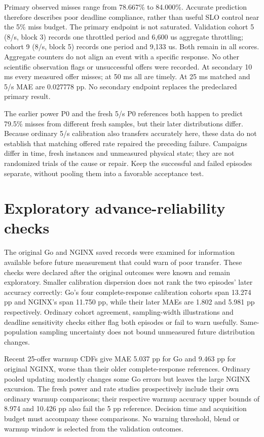 \documentclass[11pt,a4paper]{article}
\begin{document}
Primary observed misses range from 78.667\% to 84.000\%. Accurate prediction
therefore describes poor deadline compliance, rather than useful SLO control
near the 5\% miss budget. The primary endpoint is not saturated. Validation
cohort 5 (8/s, block 3) records one throttled period and 6,600 us aggregate
throttling; cohort 9 (8/s, block 5) records one period and 9,133 us. Both remain
in all scores. Aggregate counters do not align an event with a specific response.
No other scientific observation flags or unsuccessful offers were recorded.
At secondary 10 ms every measured offer misses; at 50 ms all are timely. At
25 ms matched and 5/s MAE are 0.027778 pp. No secondary endpoint replaces
the predeclared primary result.

The earlier power P0 and the fresh 5/s P0 references both happen to predict
79.5\% misses from different fresh samples, but their later distributions differ.
Because ordinary 5/s calibration also transfers accurately here, these data do
not establish that matching offered rate repaired the preceding failure.
Campaigns differ in time, fresh instances and unmeasured physical state; they
are not randomized trials of the cause or repair. Keep the successful and
failed episodes separate, without pooling them into a favorable acceptance test.

\section{Exploratory advance-reliability checks}

The original Go and NGINX saved records were examined for information available
before future measurement that could warn of poor transfer. These checks were
declared after the original outcomes were known and remain exploratory. Smaller
calibration dispersion does not rank the two episodes' later accuracy correctly:
Go's four complete-response calibration cohorts span 13.274 pp and NGINX's
span 11.750 pp, while their later MAEs are 1.802 and 5.981 pp respectively.
Ordinary cohort agreement, sampling-width illustrations and deadline sensitivity
checks either flag both episodes or fail to warn usefully. Same-population
sampling uncertainty does not bound unmeasured future distribution changes.

Recent 25-offer warmup CDFs give MAE 5.037 pp for Go and 9.463 pp for original
NGINX, worse than their older complete-response references. Ordinary pooled
updating modestly changes some Go errors but leaves the large NGINX excursion.
The fresh power and rate studies prospectively include their own ordinary
warmup comparisons; their respective warmup accuracy upper bounds of 8.974
and 10.426 pp also fail the 5 pp reference. Decision time and acquisition budget
must accompany these comparisons. No warning threshold, blend or warmup window
is selected from the validation outcomes.
\end{document}
